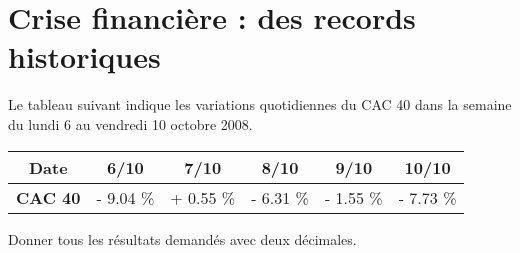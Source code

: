 \section{Crise financière : des records historiques}

Le tableau suivant indique les variations quotidiennes du CAC 40 dans la semaine du lundi 6 au vendredi 10 octobre 2008.

\begin{center}
	\begin{tabular}{|@{\ }c@{\ }|@{\ }c@{\ }|@{\ }c@{\ }|@{\ }c@{\ }|@{\ }c@{\ }|@{\ }c@{\ }|}
		\hline
		\textbf{Date}   & \textbf{6/10}   & \textbf{7/10}   & \textbf{8/10}   & \textbf{9/10}  & \textbf{10/10} \\ \hline
		\textbf{CAC 40} & - \num{9.04} \% & + \num{0.55} \% & - \num{6.31} \% & - \num{1.55} \% & - \num{7.73} \%  \\ \hline
	\end{tabular}
\end{center}

Donner tous les résultats demandés avec deux décimales.

